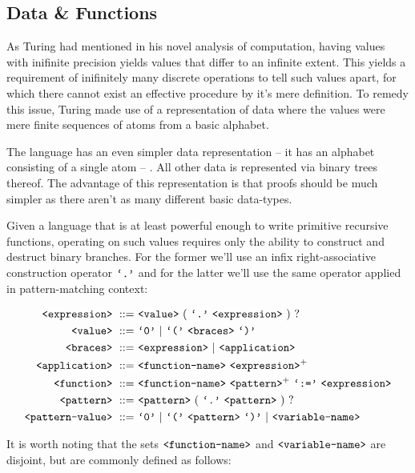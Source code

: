 \subsection{Data \& Functions}

As Turing had mentioned in his novel analysis of
computation\cite{turing-machine}, having values with inifinite precision yields
values that differ to an infinite extent. This yields a requirement of
inifinitely many discrete operations to tell such values apart, for which there
cannot exist an effective procedure by it's mere definition. To remedy this
issue, Turing made use of a representation of data where the values were mere
finite sequences of atoms from a basic alphabet.

The language  has an even simpler data representation -- it has an
alphabet consisting of a single atom -- . All other data is
represented via binary trees thereof. The advantage of this representation is
that proofs should be much simpler as there aren't as many different basic
data-types.

Given a language that is at least powerful enough to write primitive recursive
functions, operating on such values requires only the ability to construct and
destruct binary branches. For the former we'll use an infix right-associative
construction operator $\text{{\ttfamily`.'}}$ and for the latter we'll use the same operator
applied in pattern-matching context:

\begin{align}
\nonterm{expression}\ ::=&\ \nonterm{value}\ (\ \term{.}\ \nonterm{expression}
\ )\ ?\\
\nonterm{value}\ ::=&\ \term{0}\ |\ \term{(}\ \nonterm{braces}\ \term{)}\\
\nonterm{braces}\ ::=&\ \nonterm{expression}\ |
\ \nonterm{application}\\
\nonterm{application}\ ::=&\ \nonterm{function-name}
\ \nonterm{expression}^+\\
\nonterm{function}\ ::=&\ \nonterm{function-name}\ \nonterm{pattern}^+
\ \term{:=}\ \nonterm{expression}\\
\nonterm{pattern}\ ::=&\ \nonterm{pattern}\ (\ \term{.}
\ \nonterm{pattern}\ )\ ?\\
\nonterm{pattern-value}\ ::=&\ \term{0}\ |\ \term{(}
\ \nonterm{pattern}\ \term{)}\ |\ \nonterm{variable-name}
\end{align}

It is worth noting that the sets $\text{{\ttfamily<function-name>}}$ and
$\text{{\ttfamily<variable-name>}}$ are disjoint, but are commonly defined as follows:

